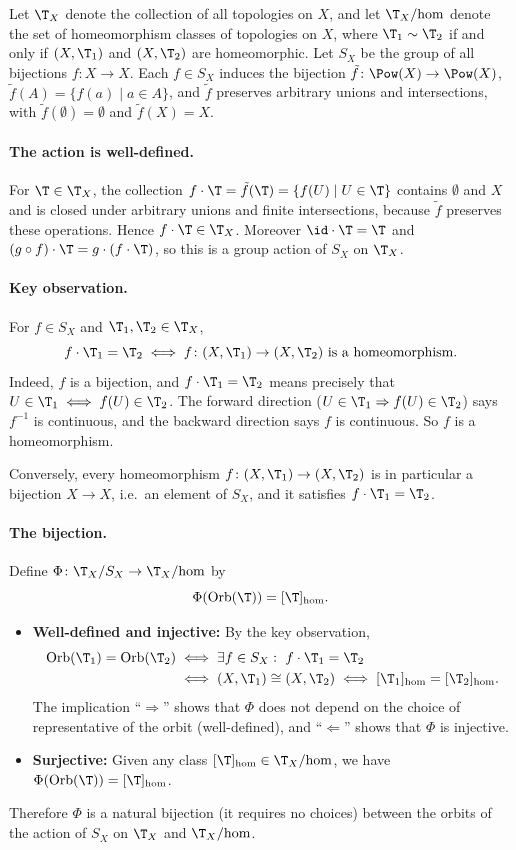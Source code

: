 
Let $\T_X$ denote the collection of all topologies on $X$, and let $\T_X/\mathrm{hom}$ denote the
set of homeomorphism classes of topologies on $X$, where $\T_1\sim\T_2$ if and only if
$(X,\T_1)$ and $(X,\T_2)$ are homeomorphic. Let $S_X$ be the group of all bijections
$f\colon X\to X$. Each $f\in S_X$ induces the bijection $\tilde f\colon\Pow(X)\to\Pow(X)$,
$\tilde f(A)=\{f(a)\mid a\in A\}$, and $\tilde f$ preserves arbitrary unions and intersections,
with $\tilde f(\emptyset)=\emptyset$ and $\tilde f(X)=X$.

\paragraph{The action is well-defined.} For $\T\in\T_X$, the collection
$f\cdot\T=\tilde f(\T)=\{f(U)\mid U\in\T\}$ contains $\emptyset$ and $X$ and is closed under
arbitrary unions and finite intersections, because $\tilde f$ preserves these operations. Hence
$f\cdot\T\in\T_X$. Moreover $\id\cdot\T=\T$ and $(g\circ f)\cdot\T=g\cdot(f\cdot\T)$, so this is
a group action of $S_X$ on $\T_X$.

\paragraph{Key observation.} For $f\in S_X$ and $\T_1,\T_2\in\T_X$,
\[ f\cdot\T_1=\T_2 \iff f\colon(X,\T_1)\to(X,\T_2) \text{ is a homeomorphism.} \]
Indeed, $f$ is a bijection, and $f\cdot\T_1=\T_2$ means precisely that
$U\in\T_1\iff f(U)\in\T_2$. The forward direction ($U\in\T_1\Rightarrow f(U)\in\T_2$) says
$f^{-1}$ is continuous, and the backward direction says $f$ is continuous. So $f$ is a
homeomorphism.

Conversely, every homeomorphism $f\colon(X,\T_1)\to(X,\T_2)$ is in particular a bijection
$X\to X$, i.e.\ an element of $S_X$, and it satisfies $f\cdot\T_1=\T_2$.

\paragraph{The bijection.} Define $\Phi\colon\T_X/S_X\to\T_X/\mathrm{hom}$ by
\[ \Phi(\operatorname{Orb}(\T))=[\T]_{\mathrm{hom}}. \]
\begin{itemize}
  \item \textbf{Well-defined and injective:} By the key observation,
  \begin{align*}
  \operatorname{Orb}(\T_1)=\operatorname{Orb}(\T_2)
  &\iff \exists f\in S_X:\ f\cdot\T_1=\T_2\\
  &\iff (X,\T_1)\cong(X,\T_2)
  \iff [\T_1]_{\mathrm{hom}}=[\T_2]_{\mathrm{hom}}.
  \end{align*}
  The implication ``$\Rightarrow$'' shows that $\Phi$ does not depend on the choice of
  representative of the orbit (well-defined), and ``$\Leftarrow$'' shows that $\Phi$ is
  injective.
  \item \textbf{Surjective:} Given any class $[\T]_{\mathrm{hom}}\in\T_X/\mathrm{hom}$, we have
  $\Phi(\operatorname{Orb}(\T))=[\T]_{\mathrm{hom}}$.
\end{itemize}
Therefore $\Phi$ is a natural bijection (it requires no choices) between the orbits of the
action of $S_X$ on $\T_X$ and $\T_X/\mathrm{hom}$.
